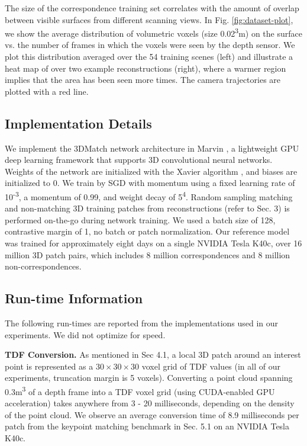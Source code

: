 \documentclass[10pt,twocolumn,letterpaper]{article}
\begin{document}
The size of the correspondence training set correlates with the amount of overlap between visible surfaces from different scanning views. In Fig. \ref{fig:dataset-plot}, we show the average distribution of volumetric voxels (size 0.02\textsuperscript{3}m) on the surface vs. the number of frames in which the voxels were seen by the depth sensor. We plot this distribution averaged over the 54 training scenes (left) and illustrate a heat map of over two example reconstructions (right),  where a warmer region implies that the area has been seen more times. The camera trajectories are plotted with a red line.



\subsection{Implementation Details}

We implement the 3DMatch network architecture in Marvin \cite{Marvin20151110}, a lightweight GPU deep learning framework that supports 3D convolutional neural networks. Weights of the network are initialized with the Xavier algorithm \cite{glorot2010understanding}, and biases are initialized to 0. We train by SGD with momentum using a fixed learning rate of 10\textsuperscript{-3}, a momentum of 0.99, and weight decay of 5\textsuperscript{4}. Random sampling matching and non-matching 3D training patches from reconstructions (refer to Sec. 3) is performed on-the-go during network training. We used a batch size of 128, contrastive margin of 1, no batch or patch normalization. Our reference model was trained for approximately eight days on a single NVIDIA Tesla K40c, over 16 million 3D patch pairs, which includes 8 million correspondences and 8 million non-correspondences.




\subsection{Run-time Information}

The following run-times are reported from the implementations used in our experiments. We did not optimize for speed.

\noindent\textbf{TDF Conversion.} As mentioned in Sec 4.1, a local 3D patch around an interest point is represented as a $30 \times 30 \times 30$ voxel grid of TDF values (in all of our experiments, truncation margin is 5 voxels). Converting a point cloud spanning 0.3m\textsuperscript{3} of a depth frame into a TDF voxel grid (using CUDA-enabled GPU acceleration) takes anywhere from 3 - 20 milliseconds, depending on the density of the point cloud. We observe an average conversion time of 8.9 milliseconds per patch from the keypoint matching benchmark in Sec. 5.1 on an NVIDIA Tesla K40c. 
\end{document}
